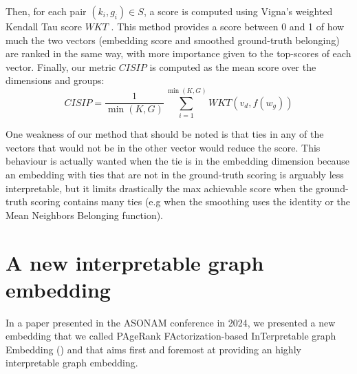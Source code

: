 Then, for each pair $(k_i, g_i) \in S$, a score is computed using Vigna's weighted Kendall Tau score $WKT$ \cite{vigna_2015}. This method provides a score between 0 and 1 of how much the two vectors (embedding score and smoothed ground-truth belonging) are ranked in the same way, with more importance given to the top-scores of each vector. Finally, our metric $CISIP$ is computed as the mean score over the dimensions and groups:
\begin{equation}
    CISIP = \frac{1}{\min(K, G)}\sum_{i=1}^{\min(K, G)}WKT(v_d, f(w_g))
\end{equation}

One weakness of our method that should be noted is that ties in any of the vectors that would not be in the other vector would reduce the score. This behaviour is actually wanted when the tie is in the embedding dimension because an embedding with ties that are not in the ground-truth scoring is arguably less interpretable, but it limits drastically the max achievable score when the ground-truth scoring contains many ties (e.g when the smoothing uses the identity or the Mean Neighbors Belonging function).

\section{A new interpretable graph embedding}%

In a paper presented in the ASONAM conference in 2024, we presented a new embedding that we called PAgeRank FActorization-based InTerpretable graph Embedding (\parfaite{}) and that aims first and foremost at providing an highly interpretable graph embedding.


